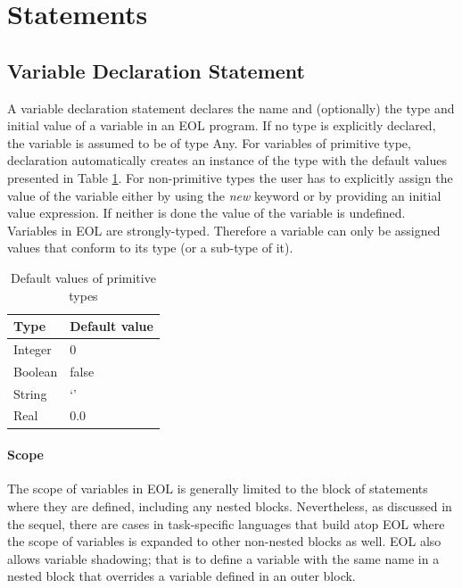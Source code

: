 \section{Statements}

\subsection{Variable Declaration Statement}

A variable declaration statement declares the name and (optionally) the type and initial value of a variable in an EOL program. If no type is explicitly declared, the variable is assumed to be of type Any. For variables of primitive type, declaration automatically creates an instance of the type with the default values presented in Table \ref{tab:DefaultValuesOfPrimitiveTypes}. For non-primitive types the user has to explicitly assign the value of the variable either by using the \emph{new} keyword or by providing an initial value expression. If neither is done the value of the variable is undefined. Variables in EOL are strongly-typed. Therefore a variable can only be assigned values that conform to its type (or a sub-type of it).

\begin{longtable}{|l|l|}
	\caption{Default values of primitive types}
	\label{tab:DefaultValuesOfPrimitiveTypes}\\
			\hline
			
			\textbf{Type} &	\textbf{Default value} \\\hline
			Integer	& 0	\\\hline	   
			Boolean &	false \\\hline	
			String	& `'	\\\hline	
			Real & 0.0 \\\hline
\end{longtable}

\paragraph{Scope} The scope of variables in EOL is generally limited to the block of statements where they are defined, including any nested blocks. Nevertheless, as discussed in the sequel, there are cases in task-specific languages that build atop EOL where the scope of variables is expanded to other non-nested blocks as well. EOL also allows variable shadowing; that is to define a variable with the same name in a nested block that overrides a variable defined in an outer block. 

